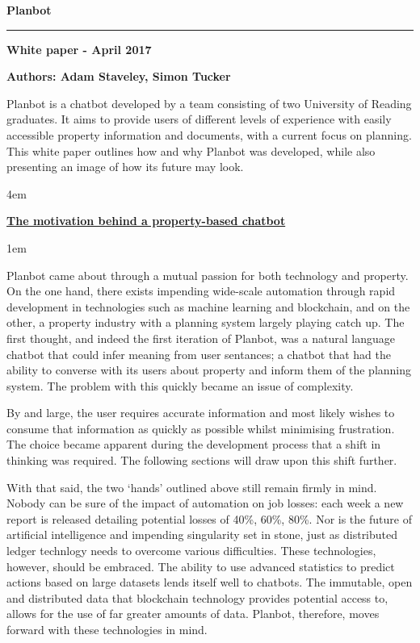 \documentclass[12pt, a4paper]{article}
\begin{document}
  {\LARGE\bfseries Planbot}

  \vspace{-0.5cm}
  \rule{\linewidth}{2pt}

  {\large\bfseries White paper - April 2017}

  {\large\bfseries Authors: Adam Staveley, Simon Tucker}

  Planbot is a chatbot developed by a team consisting of two University of
  Reading graduates. It aims to provide users of different levels of experience
  with easily accessible property information and documents, with a current
  focus on planning. This white paper outlines how and why Planbot was
  developed, while also presenting an image of how its future may look.

    \parskip 4em

  {\large\bfseries\ul{The motivation behind a property-based chatbot}}

    \parskip 1em

  Planbot came about through a mutual passion for both technology and property.
  On the one hand, there exists impending wide-scale automation through rapid
  development in technologies such as machine learning and blockchain, and on
  the other, a property industry with a planning system largely playing catch
  up. The first thought, and indeed the first iteration of Planbot, was a
  natural language chatbot that could infer meaning from user sentances; a
  chatbot that had the ability to converse with its users about property and
  inform them of the planning system. The problem with this quickly became
  an issue of complexity.

  By and large, the user requires accurate information and most likely wishes to
  consume that information as quickly as possible whilst minimising frustration.
  The choice became apparent during the development process that a shift in
  thinking was required. The following sections will draw upon this shift
  further.

  With that said, the two `hands' outlined above still remain firmly in mind.
  Nobody can be sure of the impact of automation on job losses: each week a new
  report is released detailing potential losses of 40\%, 60\%, 80\%. Nor is the
  future of artificial intelligence and impending singularity set in stone,
  just as distributed ledger technlogy needs to overcome various difficulties.
  These technologies, however, should be embraced. The ability to use advanced
  statistics to predict actions based on large datasets lends itself well to
  chatbots. The immutable, open and distributed data that blockchain technology
  provides potential access to, allows for the use of far greater amounts of
  data. Planbot, therefore, moves forward with these technologies in mind.
\end{document}
